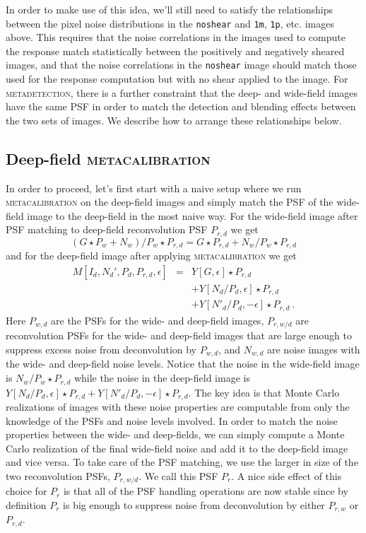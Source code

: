 \documentclass[twocolumn]{openjournal}
\makeatletter
\newcommand{\mdet}{\textsc{metadetection}\@\xspace}
\newcommand{\mcal}{\textsc{metacalibration}\@\xspace}
\newcommand{\noshear}{\texttt{noshear}\@\xspace}
\makeatother
\begin{document}
In order to make use of this idea, we'll still need to satisfy the relationships between
the pixel noise distributions in the \noshear and \texttt{1m}, \texttt{1p}, etc. images
above. This requires that the noise correlations in the images used to compute
the response match statistically between the positively and negatively sheared images,
and that the noise correlations in the \noshear image should match those used for the
response computation but with no shear applied to the image. For \mdet, there
is a further constraint that the deep- and wide-field images have the same PSF in order
to match the detection and blending effects between the two sets of images. We describe
how to arrange these relationships below.

\subsection{Deep-field \mcal}\label{sec:deepmcal}

In order to proceed, let's first start with a naive setup where we run \mcal on the
deep-field images and simply match the PSF of the wide-field image to the deep-field in
the most naive way. For the wide-field image after PSF matching to deep-field
reconvolution PSF $P_{r,d}$ we get
\begin{equation*}
  \left(G\star P_{w} + N_{w}\right)/P_{w} \star P_{r,d} = G \star P_{r,d} + N_{w}/P_{w} \star P_{r,d}
\end{equation*}
and for the deep-field image after applying \mcal we get
\begin{eqnarray}
M[I_{d}, N_{d}', P_{d}, P_{r,d}, \epsilon] & = & Y[G, \epsilon] \star P_{r,d} \nonumber \\
  & & + Y[N_{d}/P_{d}, \epsilon] \star P_{r,d} \nonumber \\
  & & + Y[N'_d/P_d, -\epsilon] \star P_{r,d} \nonumber\ .
\end{eqnarray}
Here $P_{w,d}$ are the PSFs for the wide- and deep-field images, $P_{r,w/d}$ are
reconvolution PSFs for the wide- and deep-field images that are large enough to suppress
excess noise from deconvolution by $P_{w,d}$, and $N_{w,d}$ are noise images with the
wide- and deep-field noise levels. Notice that the noise in the wide-field image is
$N_{w}/P_{w} \star P_{r,d}$ while the noise in the deep-field image is $Y[N_{d}/P_{d},
\epsilon] \star P_{r,d} + Y[N'_d/P_d, -\epsilon] \star P_{r,d}$. The key idea is that
Monte Carlo realizations of images with these noise properties are computable from only
the knowledge of the PSFs and noise levels involved. In order to match
the noise properties between the wide- and deep-fields, we can simply compute a Monte
Carlo realization of the final wide-field noise and add it to the deep-field image and
vice versa. To take care of the PSF matching, we use the larger in size of the two
reconvolution PSFs, $P_{r,w/d}$. We call this PSF $P_{r}$. A nice side effect of this
choice for $P_{r}$ is that all of the PSF handling operations are now stable since by
definition $P_{r}$ is big enough to suppress noise from deconvolution by either
$P_{r,w}$ or $P_{r,d}$.
\end{document}
